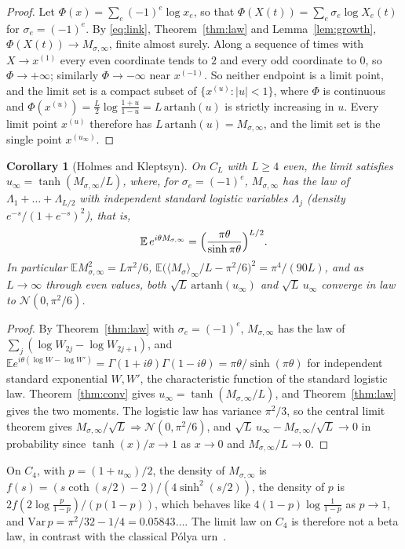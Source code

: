 \documentclass[11pt]{amsart}
\newtheorem{corollary}[theorem]{Corollary}
\theoremstyle{remark}\newtheorem{remark}[theorem]{Remark}
\begin{document}
\begin{proof}
Let $\Phi(x)=\sum_e(-1)^e\log x_e$, so that $\Phi(X(t))=\sum_e\sigma_e\log X_e(t)$ for $\sigma_e=(-1)^e$. By
\eqref{eq:link}, Theorem~\ref{thm:law} and Lemma~\ref{lem:growth}, $\Phi(X(t))\to M_{\sigma,\infty}$, finite almost surely.
Along a sequence of times with $X\to x^{(1)}$ every even coordinate tends to $2$ and every odd coordinate to $0$, so
$\Phi\to+\infty$; similarly $\Phi\to-\infty$ near $x^{(-1)}$. So neither endpoint is a limit point, and the limit set is a
compact subset of $\{x^{(u)}:|u|<1\}$, where $\Phi$ is continuous and
$\Phi(x^{(u)})=\tfrac L2\log\frac{1+u}{1-u}=L\,\mathrm{artanh}(u)$ is strictly increasing in $u$. Every limit point
$x^{(u)}$ therefore has $L\,\mathrm{artanh}(u)=M_{\sigma,\infty}$, and the limit set is the single point $x^{(u_\infty)}$.
\end{proof}

\begin{corollary}[Holmes and Kleptsyn]\label{cor:cycle}
On $C_L$ with $L\ge4$ even, the limit satisfies $u_\infty=\tanh(M_{\sigma,\infty}/L)$, where, for $\sigma_e=(-1)^e$, $M_{\sigma,\infty}$ has the law of
$\Lambda_1+\dots+\Lambda_{L/2}$ with independent standard logistic variables $\Lambda_j$ (density $e^{-s}/(1+e^{-s})^2$), that is,
\[ \mathbb{E}\,e^{i\theta M_{\sigma,\infty}}=\Bigl(\frac{\pi\theta}{\sinh\pi\theta}\Bigr)^{L/2}. \]
In particular $\mathbb{E}M_{\sigma,\infty}^2=L\pi^2/6$, $\mathbb{E}\bigl(\langle M_\sigma\rangle_\infty/L-\pi^2/6\bigr)^2=\pi^4/(90L)$, and as
$L\to\infty$ through even values, both $\sqrt L\,\mathrm{artanh}(u_\infty)$ and $\sqrt L\,u_\infty$ converge in law to
$\mathcal N(0,\pi^2/6)$.
\end{corollary}
\begin{proof}
By Theorem~\ref{thm:law} with $\sigma_e=(-1)^e$, $M_{\sigma,\infty}$ has the law of $\sum_{j}(\log W_{2j}-\log W_{2j+1})$, and
$\mathbb{E}e^{i\theta(\log W-\log W')}=\Gamma(1+i\theta)\Gamma(1-i\theta)=\pi\theta/\sinh(\pi\theta)$ for independent
standard exponential $W,W'$, the characteristic function of the standard logistic law. Theorem~\ref{thm:conv} gives
$u_\infty=\tanh(M_{\sigma,\infty}/L)$, and Theorem~\ref{thm:law} gives the two moments. The logistic law has variance $\pi^2/3$,
so the central limit theorem gives $M_{\sigma,\infty}/\sqrt L\Rightarrow\mathcal N(0,\pi^2/6)$, and
$\sqrt L\,u_\infty-M_{\sigma,\infty}/\sqrt L\to0$ in probability since $\tanh(x)/x\to1$ as $x\to0$ and $M_{\sigma,\infty}/L\to0$.
\end{proof}

On $C_4$, with $p=(1+u_\infty)/2$, the density of $M_{\sigma,\infty}$ is $f(s)=(s\coth(s/2)-2)/(4\sinh^2(s/2))$, the density of
$p$ is $2f(2\log\frac{p}{1-p})/(p(1-p))$, which behaves like $4(1-p)\log\frac1{1-p}$ as $p\to1$, and
$\mathrm{Var}\,p=\pi^2/32-1/4=0.05843\dots$. The limit law on $C_4$ is therefore not a beta law, in contrast with
the classical P\'olya urn~\cite[Theorem~2.1]{Pemantle}.
\end{document}
